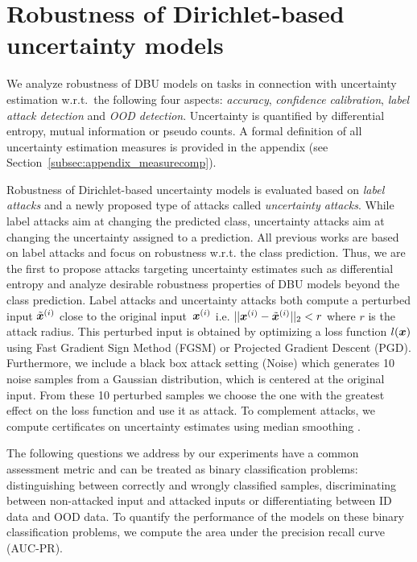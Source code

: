 \section{Robustness of Dirichlet-based uncertainty models}
\label{sec:attack_dirichlet_model}

We analyze robustness of DBU models on tasks in connection with uncertainty estimation w.r.t.\ the following four aspects: \emph{accuracy}, \emph{confidence calibration}, \emph{label attack detection} and \emph{OOD detection}. Uncertainty is quantified by differential entropy, mutual information or pseudo counts. 
A formal definition of all uncertainty estimation measures is provided in the appendix (see Section~\ref{subsec:appendix_measurecomp}).  

Robustness of Dirichlet-based uncertainty models is evaluated based on \emph{label attacks} and a newly proposed type of attacks called \emph{uncertainty attacks}. 
While label attacks aim at changing the predicted class, uncertainty attacks aim at changing the uncertainty assigned to a prediction. 
All previous works are based on label attacks and focus on robustness w.r.t. the class prediction. Thus, we are the first to propose attacks targeting uncertainty estimates such as differential entropy and analyze desirable robustness properties of DBU models beyond the class prediction. 
Label attacks and uncertainty attacks both compute a perturbed input $\tilde{{\bm{x}}}^{(i)}$ close to the original input~${\bm{x}}^{(i)}$ i.e. $|| {\bm{x}}^{(i)} - \tilde{{\bm{x}}}^{(i)} ||_2 < r$ where $r$ is the attack radius. This perturbed input is obtained by optimizing a loss function $l({\bm{x}})$ using Fast Gradient Sign Method (FGSM) or Projected Gradient Descent (PGD). Furthermore, we include a black box attack setting (Noise) which generates 10 noise samples from a Gaussian distribution, which is centered at the original input. From these 10 perturbed samples we choose the one with the greatest effect on the loss function and use it as attack. 
To complement attacks, we compute certificates on uncertainty estimates using median smoothing \cite{median_smoothing}. 


The following questions we address by our experiments have a common assessment metric and can be treated as binary classification problems: distinguishing between correctly and wrongly classified samples, discriminating between non-attacked input and attacked inputs or differentiating between ID data and OOD data. To quantify the performance of the models on these binary classification problems, we compute the area under the precision recall curve (AUC-PR).

